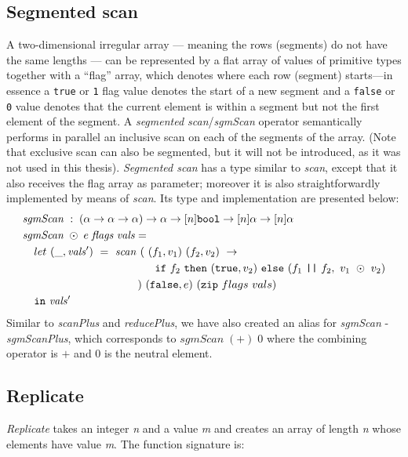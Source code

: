 \subsection{Segmented scan}
A two-dimensional irregular array --- meaning the rows (segments) do not have the same lengths --- can be represented by a flat array of values of primitive types together with a ``flag'' array, which denotes where each row (segment) starts---in essence a {\tt true} or {\tt 1} flag value denotes the start of a new segment and a {\tt false} or {\tt 0} value denotes that the current element is within a segment but not the first element of the segment. A \textit{segmented scan}/\textit{sgmScan} operator semantically performs in parallel an inclusive scan on each of the segments of the array.  (Note that exclusive scan can also be segmented, but it will not be introduced, as it was not used in this thesis).
\textit{Segmented scan} has a type similar to \textit{scan}, except that it also receives the flag array as parameter; moreover it is also straightforwardly implemented by means of \textit{scan}. Its type and implementation are presented below:
\begin{align}
  \nonumber&\mathit{sgmScan}\;:\;(\alpha\rightarrow\alpha\rightarrow\alpha)\rightarrow\alpha\rightarrow[n]\mbox{\tt bool}\rightarrow[n]\alpha\rightarrow[n]\alpha\\
  \nonumber&\mathit{sgmScan}\;\odot\;e\;\mathit{flags}\;\mathit{vals}=\\
  \nonumber&\mbox{\tt~~}let~(\_,\mathit{vals'})~=~\mathit{scan}~(\ (f_1,v_1)~(f_2,v_2)~\rightarrow\\
  \nonumber&\mbox{\tt~~~~~~~~~~~~~~~~~~~~~~~} \mbox{\tt if}~f_2~\mbox{\tt then}~(\mbox{\tt true},v_2)~\mbox{\tt else}~(f_1~\mbox{\tt ||}~f_2,~v_1~\odot~v_2)\\
  \nonumber&\mbox{\tt~~~~~~~~~~~~~~~~~~~~} )~(\mbox{\tt false},e)~(\mbox{\tt zip}~flags~vals)\\
  \nonumber&\mbox{\tt~~in}~\mathit{vals'}
\end{align}
Similar to \textit{scanPlus} and \textit{reducePlus}, we have also created an alias for \textit{sgmScan} - \textit{sgmScanPlus}, which corresponds to $\mathit{sgmScan}\;(+)\;0$ where the combining operator is $+$ and $0$ is the neutral element.

\subsection{Replicate}
\textit{Replicate} takes an integer \textit{n} and a value \textit{m} and creates an array of length \textit{n} whose elements have value \textit{m}. The function signature is:

